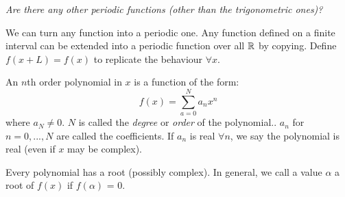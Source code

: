 \documentclass[10pt]{scrartcl}
\begin{document}
\emph{Are there any other periodic functions (other than the trigonometric ones)?}\\

  \begin{center}
\end{center}



We can turn any function into a periodic one. Any function defined on a finite interval can be extended into a periodic function over all $\mathbb{R}$ by copying. Define $f(x + L) = f(x)$ to replicate the behaviour $\forall x$.


\vspace*{5pt}
\begin{definition}
An $n$th order   polynomial in $x$ is a function of the form: \[f(x) = \displaystyle{\sum_{a=0}^{N} a_n x^n}\]
 where $a_N \neq 0$. $N$ is called the \emph{degree} or \emph{order} of the polynomial.. $a_n$ for $n = 0,...,N$ are called the coefficients. If $a_n$ is real $\forall n$, we say the polynomial is real (even if $x$ may be complex).
\end{definition}

\begin{theorem}

Every polynomial has a root (possibly complex). In general, we call a value $\alpha$ a root of $f(x)$ if $f(\alpha)$ = 0. 

\end{theorem}
\end{document}
